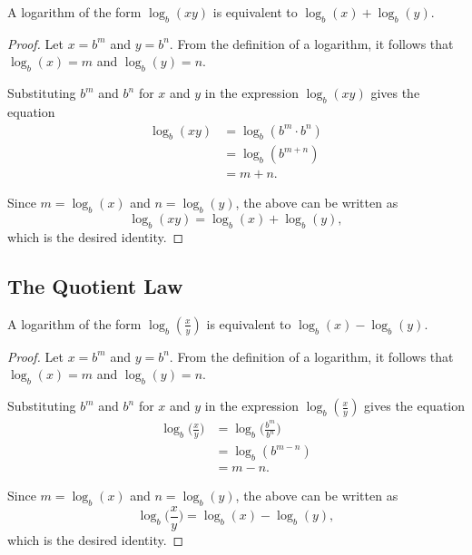 \documentclass[parskip]{scrartcl}
\begin{document}
\begin{theorem}
  A logarithm of the form \(\log_{b}(xy)\) is equivalent to \(\log_{b}(x) +
  \log_{b}(y)\).
\end{theorem}

\begin{proof}
  Let \(x = b^{m}\) and \(y = b^{n}\). From the definition of a logarithm, it
  follows that \(\log_{b}(x) = m\) and \(\log_{b}(y) = n\).

  Substituting \(b^{m}\) and \(b^{n}\) for \(x\) and \(y\) in the expression
  \(\log_{b}(xy)\) gives the equation
  \begin{equation*}
    \begin{split}
      \log_{b}(xy) &= \log_{b}(b^{m} · b^{n}) \\
      &= \log_{b}(b^{m + n}) \\
      &= m + n.
    \end{split}
  \end{equation*}

  Since \(m = \log_{b}(x)\) and \(n = \log_{b}(y)\), the above can be written as
  \begin{equation*}
    \log_{b}(xy) = \log_{b}(x) + \log_{b}(y),
  \end{equation*}
  which is the desired identity.
\end{proof}

\subsection{The Quotient Law}

\begin{theorem}
  A logarithm of the form \(\log_{b}(\frac{x}{y})\) is equivalent to
  \(\log_{b}(x) - \log_{b}(y)\).
\end{theorem}

\begin{proof}
  Let \(x = b^{m}\) and \(y = b^{n}\). From the definition of a logarithm, it
  follows that \(\log_{b}(x) = m\) and \(\log_{b}(y) = n\).

  Substituting \(b^{m}\) and \(b^{n}\) for \(x\) and \(y\) in the expression
  \(\log_{b}(\frac{x}{y})\) gives the equation
  \begin{equation*}
    \begin{split}
      \log_{b}\big(\frac{x}{y}\big) &= \log_{b}\big(\frac{b^{m}}{b^{n}}\big) \\
      &= \log_{b}(b^{m - n}) \\
      &= m - n.
    \end{split}
  \end{equation*}

  Since \(m = \log_{b}(x)\) and \(n = \log_{b}(y)\), the above can be written as
  \begin{equation*}
    \log_{b}\big(\frac{x}{y}\big) = \log_{b}(x) - \log_{b}(y),
  \end{equation*}
  which is the desired identity.
\end{proof}
\end{document}
